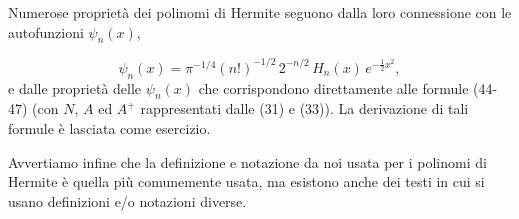 \documentclass[11pt, a4paper]{book}
\numberwithin{equation}{section}
\begin{document}
Numerose proprietà dei polinomi di Hermite seguono dalla loro
connessione con le autofunzioni $\psi_n(x)$,


\begin{equation}
\psi_n(x) = \pi^{-1/4}(n!)^{-1/2}\,2^{-n/2}\,H_n(x)\,e^{-\frac{1}{2}x^2},
\end{equation}
e dalle proprietà delle $\psi_n(x)$ che corrispondono direttamente alle
formule (44-47) (con $N$, $A$ ed $A^+$ rappresentati dalle (31) e (33)).
La derivazione di tali formule è lasciata come esercizio.

Avvertiamo infine che la definizione e notazione da noi usata per i
polinomi di Hermite è quella più comunemente usata, ma esistono anche dei
testi in cui si usano definizioni e/o notazioni diverse.
\end{document}
